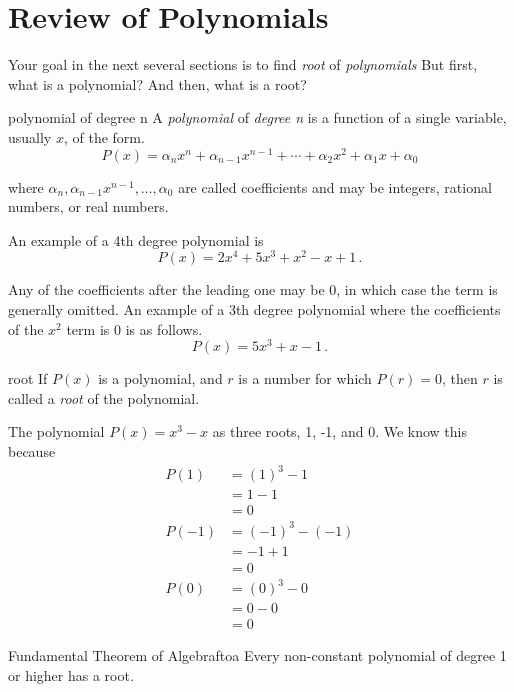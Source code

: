 \section{Review of Polynomials}
\label{sec.general}

Your goal in the next several sections is to find \emph{root} of \emph{polynomials}
But first, what is a polynomial? And then, what is a root?

\begin{definition}{polynomial of degree n}{}
  A \emph{polynomial} of \emph{degree n} is a function of a single variable, usually $x$,
  of the form.
  \[P(x) = \alpha_n x^n + \alpha_{n-1} x^{n-1} + \cdots + \alpha_2 x^2 + \alpha_1 x + \alpha_0 \]

  where $\alpha_n,  \alpha_{n-1} x^{n-1}, \ldots, \alpha_0$ are called coefficients and may be integers, rational numbers, or real numbers.
\end{definition}

An example of a 4th degree polynomial is
\[P(x) = 2 x^4 + 5 x^3 + x^2 - x + 1\,.\]


Any of the coefficients after the leading one may be 0, in which case the term is generally omitted.
An example of a 3th degree polynomial where the coefficients of the $x^2$ term is 0 is as follows.
\[P(x) = 5 x^3 + x - 1\,.\]

\begin{definition}{root}{}
  If $P(x)$ is a polynomial, and $r$ is a number for which $P(r)=0$, then $r$ is called a \emph{root}
  of the polynomial.
\end{definition}

The polynomial $P(x) = x^3 - x$ as three roots, 1, -1, and 0.  We know this because
\begin{align*}
  P(1) &= (1)^3 - 1 \\
  &= 1 - 1 \\
  &= 0\\[3pt]
  P(-1) &= (-1)^3 - (-1) \\
  &= -1 + 1 \\
  &= 0\\[3pt]
  P(0) &= (0)^3 - 0\\
  &= 0 - 0 \\
  &= 0  
\end{align*}

\begin{theorem}{Fundamental Theorem of Algebra}{ftoa}
  Every non-constant polynomial of degree 1 or higher has a root.
\end{theorem}

